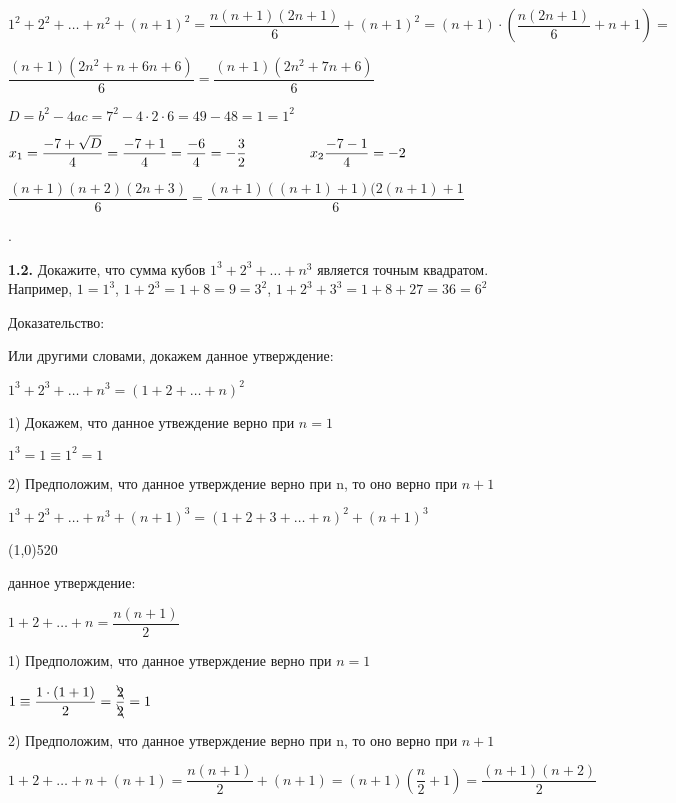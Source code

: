 \documentclass[12pt]{article}
\begin{document}
	$
	1^2+2^2+\dots+n^2+(n+1)^2 = \dfrac{n(n+1)(2n+1)}{6} +(n+1)^2 = (n+1)\cdot\left(\dfrac{n(2n+1)}{6}+n+1\right) = 
	$
	
	$
	\dfrac{(n+1)(2n^2+n+6n+6)}{6} = \dfrac{(n+1)(2n^2+7n+6)}{6}
	$
	\medskip
	
	\quad$D = b^2-4ac = 7^2 -4\cdot2\cdot6 = 49 - 48 = 1 = 1^2$
	
	\medskip
	
	\qquad$
	x_1 = \dfrac{-7 + \sqrt{D}}{4} = \dfrac{-7 + 1}{4} = \dfrac{-6}{4} = -\dfrac{3}{2} \hspace{1.6cm}  x_2 \dfrac{-7-1}{4} = -2
	$
	\medskip
	
	\qquad$
	\dfrac{(n+1)(n+2)(2n+3)}{6} = \dfrac{(n+1)((n+1)+1)(2(n+1)+1}{6}
	$
	
	\medskip
	{.}\medskip
	
	{\bf1.2.} Докажите, что сумма кубов $1^3+2^3+\dots+n^3$ является точным квадратом. Например, $1=1^3$, $1+2^3=1+8=9=3^2$, $1+2^3+3^3=1+8+27=36=6^2$
	
	
	
	\hspace{-2mm} Доказательство:
	\vspace{1mm}
	
	Или другими словами, докажем данное утверждение:
	
	\qquad$
	1^3+2^3+\dots+n^3 = (1+2+\dots+n)^2
	$\medskip
	
	1) Докажем, что данное утвеждение верно при $n=1$
	
	\quad$
	1^3 = 1 \equiv 1^2 = 1
	$
	
	2) Предположим, что данное утверждение верно при n, то оно верно при $n+1$\medskip
	
	$
	1^3+2^3+\dots+n^3+(n+1)^3 = (1+2+3+\dots+n)^2+(n+1)^3
	$
	
	\line(1,0){520}
	
	 данное утверждение:\smallskip
	
	\qquad$
	1+2+\dots+n = \dfrac{n(n+1)}{2}
	$
	
	1) Предположим, что данное утверждение верно при $n=1$\vspace{2mm}
	
	\quad $
		1 \equiv \dfrac{1\cdot(1+1)}{2} = \dfrac{\bcancel{2}}{\bcancel{2}} = 1
	$
	
	\vspace{2mm}
	2) Предположим, что данное утверждение верно при n, то оно верно при $n+1$
	
	\quad$
		1+2+\dots+n+(n+1) = \dfrac{n(n+1)}{2}+(n+1) = (n+1)\left(\dfrac{n}{2}+1\right) = \dfrac{(n+1)(n+2)}{2} 
	$
	
\end{document}
